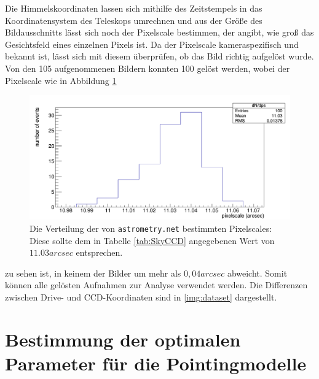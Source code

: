 Die Himmelskoordinaten lassen sich mithilfe des Zeitstempels in das Koordinatensystem des Teleskops umrechnen und aus der Größe des Bildausschnitts lässt sich noch der Pixelscale bestimmen, der angibt, wie groß das Gesichtsfeld eines einzelnen Pixels ist. Da der Pixelscale kameraspezifisch und bekannt ist, lässt sich mit diesem überprüfen, ob das Bild richtig aufgelöst wurde. Von den 105 aufgenommenen Bildern konnten 100 gelöst werden, wobei der Pixelscale wie in Abbildung \ref{img:ps}
\begin{figure}[htbp]
\centering
\includegraphics[width=\textwidth]{../341/histo.png}
\caption{Die Verteilung der von \texttt{astrometry.net} bestimmten Pixelscales: Diese sollte dem in Tabelle \ref{tab:SkyCCD} angegebenen Wert von $11.03\unit{arcsec}$ entsprechen.}
\label{img:ps}
\end{figure}
zu sehen ist, in keinem der Bilder um mehr als $0,04\unit{arcsec}$ abweicht. Somit können alle gelösten Aufnahmen zur Analyse verwendet werden. Die Differenzen zwischen Drive- und CCD-Koordinaten sind in \ref{img:dataset} dargestellt.
\section{Bestimmung der optimalen Parameter für die Pointingmodelle}


